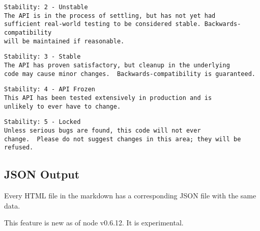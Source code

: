 \begin{verbatim}
Stability: 2 - Unstable
The API is in the process of settling, but has not yet had
sufficient real-world testing to be considered stable. Backwards-compatibility
will be maintained if reasonable.
\end{verbatim}

\begin{verbatim}
Stability: 3 - Stable
The API has proven satisfactory, but cleanup in the underlying
code may cause minor changes.  Backwards-compatibility is guaranteed.
\end{verbatim}

\begin{verbatim}
Stability: 4 - API Frozen
This API has been tested extensively in production and is
unlikely to ever have to change.
\end{verbatim}

\begin{verbatim}
Stability: 5 - Locked
Unless serious bugs are found, this code will not ever
change.  Please do not suggest changes in this area; they will be refused.
\end{verbatim}

\subsection{JSON Output}

\begin{Shaded}
\begin{Highlighting}[]
\NormalTok{: } 
\end{Highlighting}
\end{Shaded}

Every HTML file in the markdown has a corresponding JSON file with the
same data.

This feature is new as of node v0.6.12. It is experimental.
